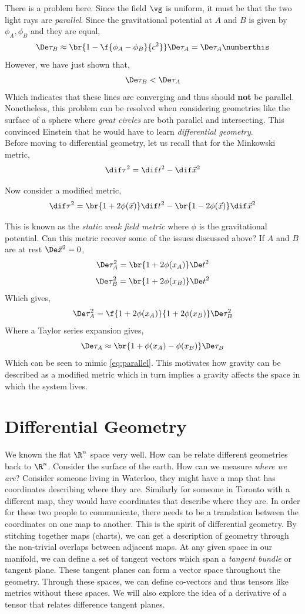 \documentclass{article}
\begin{document}
There is a problem here. Since the field $\vg$ is uniform, it must be that the two light rays are \textit{parallel}. Since the gravitational potential at $A$ and $B$ is given by $\phi_A, \phi_B$ and they are equal,
\[ \De \tau_B \approx \br{1 - \f{\phi_A - \phi_B}{c^2}} \De \tau_A = \De \tau_A \numberthis \label{eq:parallel} \]
However, we have just shown that,
\[ \De \tau_B < \De \tau_A \]
Which indicates that these lines are converging and thus should \textbf{not} be parallel. Nonetheless, this problem can be resolved when considering geometries like the surface of a sphere where \textit{great circles} are both parallel and intersecting. This convinced Einstein that he would have to learn \textit{differential geometry}. \\

Before moving to differential geometry, let us recall that for the Minkowski metric,
\[ \dif \tau^2 = \dif t^2 - \dif \vec{x}^2 \]

Now consider a modified metric,
\[ \dif \tau^2 = \br{1+2\phi(\vec{x})}\dif t^2 - \br{1-2\phi(\vec{x})}\dif \vec{x}^2 \]

This is known as the \textit{static weak field metric} where $\phi$ is the gravitational potential. Can this metric recover some of the issues discussed above? If $A$ and $B$ are at rest $\De \vec{x}^2 = 0$,
\[ \De \tau_A^2 = \br{1+2\phi(x_A)}\De t^2 \]
\[ \De \tau_B^2 = \br{1+2\phi(x_B)}\De t^2 \]
Which gives,
\[ \De \tau_A^2 = \f{1+2\phi(x_A)}{1+2\phi(x_B)}\De \tau_B^2 \]
Where a Taylor series expansion gives,
\[ \De \tau_A \approx \br{1+\phi(x_A)-\phi(x_B)}\De \tau_B \]
Which can be seen to mimic \eqref{eq:parallel}. This motivates how gravity can be described as a modified metric which in turn implies a gravity affects the space in which the system lives.

\section{Differential Geometry}

We known the flat $\R^n$ space very well. How can be relate different geometries back to $\R^n$. Consider the surface of the earth. How can we measure \textit{where we are}? Consider someone living in Waterloo, they might have a map that has coordinates describing where they are. Similarly for someone in Toronto with a different map, they would have coordinates that describe where they are. In order for these two people to communicate, there needs to be a translation between the coordinates on one map to another. This is the spirit of differential geometry. By stitching together maps (charts), we can get a description of geometry through the non-trivial overlaps between adjacent maps. At any given space in our manifold, we can define a set of tangent vectors which span a \textit{tangent bundle} or tangent plane. These tangent planes can form a vector space throughout the geometry. Through these spaces, we can define co-vectors and thus tensors like metrics without these spaces. We will also explore the idea of a derivative of a tensor that relates difference tangent planes.
\end{document}
